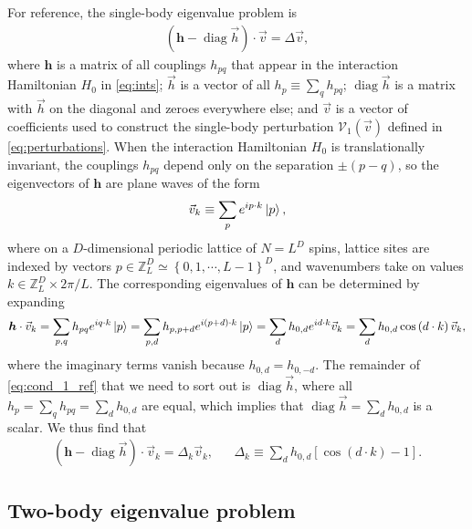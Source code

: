 \documentclass[nofootinbib,notitlepage,11pt]{revtex4-2}
\newcommand{\p}[1]{\left(#1\right)} %
\renewcommand{\sp}[1]{\left[#1\right]} %
\renewcommand{\set}[1]{\left\{#1\right\}} %
\renewcommand{\c}{\cdot} %
\newcommand{\m}{\bm} %
\renewcommand{\v}{\vec} %
\newcommand{\1}{\mathds{1}}
\newcommand{\V}{\mathcal{V}}
\newcommand{\ZZ}{\mathbb{Z}}
\DeclareMathOperator{\diag}{diag}
\begin{document}
For reference, the single-body eigenvalue problem is
\begin{align}
  \p{\m h - \diag\v h}\c\v v = \Delta \v v,
  \label{eq:cond_1_ref}
\end{align}
where $\m h$ is a matrix of all couplings $h_{pq}$ that appear in the
interaction Hamiltonian $H_0$ in \eqref{eq:ints}; $\v h$ is a vector
of all $h_p\equiv\sum_q h_{pq}$; $\diag\v h$ is a matrix with $\v h$
on the diagonal and zeroes everywhere else; and $\v v$ is a vector of
coefficients used to construct the single-body perturbation
$\V_1\p{\v v}$ defined in \eqref{eq:perturbations}.  When the
interaction Hamiltonian $H_0$ is translationally invariant, the
couplings $h_{pq}$ depend only on the separation $\pm\p{p-q}$, so the
eigenvectors of $\m h$ are plane waves of the form
\begin{align}
  \v v_k \equiv \sum_p e^{ip\c k} \ket{p},
\end{align}
where on a $D$-dimensional periodic lattice of $N=L^D$ spins, lattice
sites are indexed by vectors
$p\in\ZZ_L^D\simeq\set{0,1,\cdots,L-1}^D$, and wavenumbers take on
values $k\in\ZZ_L^D\times2\pi/L$.  The corresponding eigenvalues of
$\m h$ can be determined by expanding
\begin{align}
  \m h\c\v v_k = \sum_{p,q} h_{pq} e^{iq\c k} \ket{p}
  = \sum_{p,d} h_{p,p+d} e^{i\p{p+d}\c k} \ket{p}
  = \sum_d h_{0,d} e^{id\c k} \v v_k
  = \sum_d h_{0,d} \cos\p{d\c k} \v v_k,
\end{align}
where the imaginary terms vanish because $h_{0,d}=h_{0,-d}$.  The
remainder of \eqref{eq:cond_1_ref} that we need to sort out is
$\diag\v h$, where all $h_p=\sum_qh_{pq}=\sum_dh_{0,d}$ are equal,
which implies that $\diag\v h=\sum_dh_{0,d}$ is a scalar.  We thus
find that
\begin{align}
  \p{\m h - \diag\v h}\c\v v_k = \Delta_k \v v_k,
  &&
  \Delta_k \equiv \sum_d h_{0,d} \sp{\cos\p{d\c k}-1}.
\end{align}

\subsection{Two-body eigenvalue problem}
\label{sec:trans_inv_two}
\end{document}

